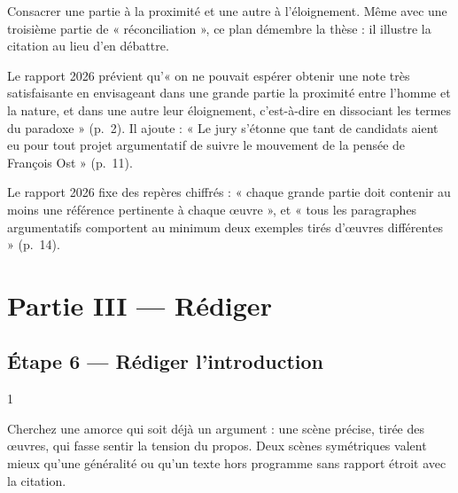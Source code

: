 \documentclass[11pt,a4paper]{article}
\begin{document}
\begin{piege}

Consacrer une partie à la proximité et une autre à l'éloignement. Même avec une troisième partie de « réconciliation », ce plan démembre la thèse : il illustre la citation au lieu d'en débattre.

\end{piege}

\begin{jury}

Le rapport 2026 prévient qu'« on ne pouvait espérer obtenir une note très satisfaisante en envisageant dans une grande partie la proximité entre l'homme et la nature, et dans une autre leur éloignement, c'est-à-dire en dissociant les termes du paradoxe » (p.~2). Il ajoute : « Le jury s'étonne que tant de candidats aient eu pour tout projet argumentatif de suivre le mouvement de la pensée de François Ost » (p.~11).

\end{jury}

\begin{jury}

Le rapport 2026 fixe des repères chiffrés : « chaque grande partie doit contenir au moins une référence pertinente à chaque œuvre », et « tous les paragraphes argumentatifs comportent au minimum deux exemples tirés d'œuvres différentes » (p.~14).

\end{jury}

\hypertarget{partie-iii-ruxe9diger}{%
\section{Partie III --- Rédiger}\label{partie-iii-ruxe9diger}}

\hypertarget{uxe9tape-6-ruxe9diger-lintroduction}{%
\subsection{Étape 6 --- Rédiger l'introduction}\label{uxe9tape-6-ruxe9diger-lintroduction}}

\begin{indication}{1}

Cherchez une amorce qui soit déjà un argument : une scène précise, tirée des œuvres, qui fasse sentir la tension du propos. Deux scènes symétriques valent mieux qu'une généralité ou qu'un texte hors programme sans rapport étroit avec la citation.

\end{indication}
\end{document}
